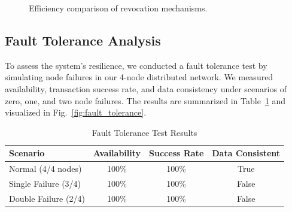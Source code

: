 \documentclass[lettersize,journal]{IEEEtran}
\begin{document}
\begin{itemize}
\begin{figure}[!t]
\centering
{}
\hfil
{}
\caption{Efficiency comparison of revocation mechanisms.}
\label{fig:revocation_comparison}
\end{figure}

\subsection{Fault Tolerance Analysis}
To assess the system's resilience, we conducted a fault tolerance test by simulating node failures in our 4-node distributed network. We measured availability, transaction success rate, and data consistency under scenarios of zero, one, and two node failures. The results are summarized in Table~\ref{tab:fault_tolerance} and visualized in Fig.~\ref{fig:fault_tolerance}.

\begin{table}[!t]
\caption{Fault Tolerance Test Results}
\label{tab:fault_tolerance}
\centering
\begin{tabular}{|l|c|c|c|}
\hline
\textbf{Scenario} & \textbf{Availability} & \textbf{Success Rate} & \textbf{Data Consistent} \\
\hline
Normal (4/4 nodes) & 100\% & 100\% & True \\
Single Failure (3/4) & 100\% & 100\% & False \\
Double Failure (2/4) & 100\% & 100\% & False \\
\hline
\end{tabular}
\end{table}


\end{itemize}
\end{document}
